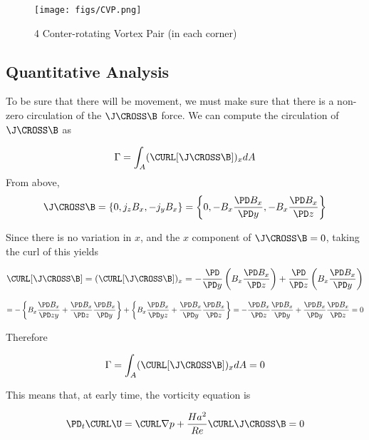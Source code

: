 \documentclass[11pt]{article}
\newcommand{\BfigS}{50em}
\newcommand{\BfigH}{\BfigS}
\newcommand{\BfigW}{\BfigS}
\begin{document}
\begin{figure}[H]
 \centering
  \texttt{[image: figs/CVP.png]}
   \caption[Optional ]{4 Conter-rotating Vortex Pair (in each corner)}
\end{figure}

\subsection{Quantitative Analysis}
To be sure that there will be movement, we must make sure that there is a non-zero circulation of the $\J \CROSS \B$ force. We can compute the circulation of $\J \CROSS \B$ as

\begin{equation}
	\Gamma = \int_A ( \CURL [\J \CROSS \B] )_x dA
\end{equation}
From above,
\begin{equation}
	\J \CROSS \B
	=
	\{
	0 ,
	j_z B_x ,
	-j_y B_x
	\}
	=
	\left\{
	0 ,
	- B_x \frac{\PD B_x}{\PD y} ,
	- B_x \frac{\PD B_x}{\PD z}
	\right\}
\end{equation}


Since there is no variation in $x$, and the $x$ component of $\J \CROSS \B=0$, taking the curl of this yields

\begin{equation}
	\CURL [\J \CROSS \B]
	=
	(\CURL [\J \CROSS \B]) _x
	=
	-
	\frac{\PD}{\PD y} \left( B_x \frac{\PD B_x}{\PD z} \right)
	+
	\frac{\PD}{\PD z} \left( B_x \frac{\PD B_x}{\PD y} \right)
\end{equation}

\begin{equation}
	=
	-
	\left\{
	B_x \frac{\PD B_x}{\PD z y} + \frac{\PD B_x}{\PD z} \frac{\PD B_x}{\PD y}
	\right\}
	+
	\left\{
	B_x \frac{\PD B_x}{\PD y z} + \frac{\PD B_x}{\PD y} \frac{\PD B_x}{\PD z}
	\right\}
	=
	-
	\frac{\PD B_x}{\PD z} \frac{\PD B_x}{\PD y}
	+
	\frac{\PD B_x}{\PD y} \frac{\PD B_x}{\PD z}
	= 0
\end{equation}

Therefore

\begin{equation}
	\Gamma = \int_A ( \CURL [\J \CROSS \B] )_x dA = 0
\end{equation}


This means that, at early time, the vorticity equation is

\begin{equation}
	\PD_t \CURL \U = \CURL \nabla p
	+
	\frac{Ha^2}{Re}
	\CURL
	\J \CROSS \B
	=
	0
\end{equation}
\end{document}
